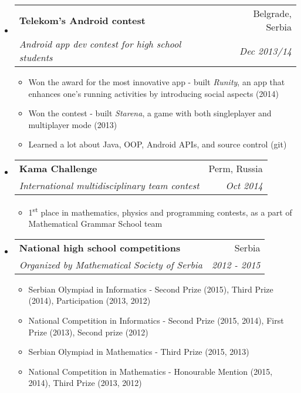 \documentclass[letterpaper,11pt]{article}
\makeatletter
\newcommand{\resitem}[1]{\item #1 \vspace{-2pt}} %
\newcommand{\ressubheading}[4]{
\begin{tabular*}{6.5in}{l@{\cftdotfill{\cftsecdotsep}\extracolsep{\fill}}r} %
    \textbf{#1} & #2 \\
    \textit{#3} & \textit{#4} \\
\end{tabular*}\vspace{0pt}} %
\makeatother
\begin{document}
\begin{itemize}
\pagebreak

\item \ressubheading{Telekom's Android contest}{Belgrade, Serbia}{Android app dev contest for high school students}{Dec 2013/14}
\begin{itemize}
  \resitem{Won the award for the most innovative app - built \textit{Runity}, an app that enhances one's running activities by introducing social aspects (2014)}
  \resitem{Won the contest - built \textit{Starena}, a game with both singleplayer and multiplayer mode (2013)}
  \resitem{Learned a lot about Java, OOP, Android APIs, and source control (git)}
\end{itemize}

\item \ressubheading{Kama Challenge}{Perm, Russia}{International multidisciplinary team contest}{Oct 2014}
\begin{itemize}
  \resitem{1\textsuperscript{st} place in mathematics, physics and programming contests, as a part of Mathematical Grammar School team}
\end{itemize}

\begin{comment}
\item \ressubheading{International Mathematical Arhimede Contest}{Bucharest, Romania}{International math contest}{Jul 2013}
\begin{itemize}
  \resitem{Silver medal}
\end{itemize}
\end{comment}

\item \ressubheading{National high school competitions}{Serbia}{Organized by Mathematical Society of Serbia}{2012 - 2015}
\begin{itemize}
  \resitem{Serbian Olympiad in Informatics - Second Prize (2015), Third Prize (2014), Participation (2013, 2012)}
  \resitem{National Competition in Informatics - Second Prize (2015, 2014), First Prize (2013), Second prize (2012)}
   \resitem{Serbian Olympiad in Mathematics - Third Prize (2015, 2013)}  
   \resitem{National Competition in Mathematics - Honourable Mention (2015, 2014), Third Prize (2013, 2012)}
\end{itemize}


\end{itemize}
\end{document}
